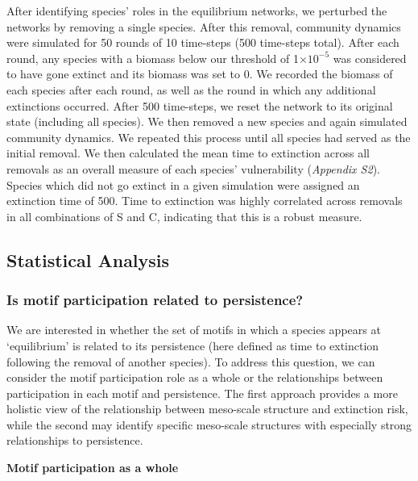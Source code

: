 \documentclass[12pt]{article}
\begin{document}
\begin{spacing}{2.0}
    		After identifying species' roles in the equilibrium networks, we perturbed the networks by removing a single species. After this removal, community dynamics were simulated for 50 rounds of 10 time-steps (500 time-steps total). After each round, any species with a biomass below our threshold of 1$\times10^{-5}$ was considered to have gone extinct and its biomass was set to 0. We recorded the biomass of each species after each round, as well as the round in which any additional extinctions occurred. After 500 time-steps, we reset the network to its original state (including all species). We then removed a new species and again simulated community dynamics. We repeated this process until all species had served as the initial removal.
    		We then calculated the mean time to extinction across all removals as an overall measure of each species' vulnerability (\emph{Appendix S2}). 
    		Species which did not go extinct in a given simulation were assigned an extinction time of 500.
    		Time to extinction was highly correlated across removals in all combinations of S and C, indicating that this is a robust measure.


	\subsection*{Statistical Analysis}

        \subsubsection*{Is motif participation related to persistence?}

            We are interested in whether the set of motifs in which a species appears at `equilibrium' is related to its persistence (here defined as time to extinction following the removal of another species). 
            To address this question, we can consider the motif participation role as a whole or the relationships between participation in each motif and persistence. 
            The first approach provides a more holistic view of the relationship between meso-scale structure and extinction risk, while the second may identify specific meso-scale structures with especially strong relationships to persistence.


            \textbf{Motif participation as a whole}


\end{spacing}
\end{document}
